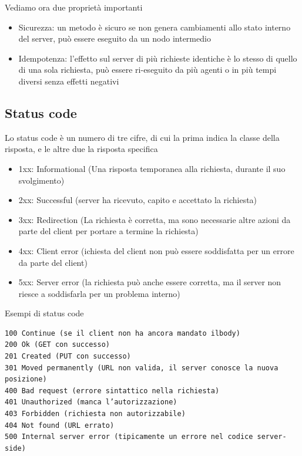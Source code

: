 \documentclass[a4paper,12pt]{article}
\begin{document}
\vspace{2em} 
Vediamo ora due proprietà importanti
\begin{itemize}
  \item Sicurezza: un metodo è sicuro se non genera cambiamenti allo stato interno del server, può essere eseguito da un nodo intermedio
  \item Idempotenza: l’effetto sul server di più richieste identiche è lo stesso di quello di una sola richiesta, può essere ri-eseguito da più agenti o in più tempi diversi senza effetti negativi
\end{itemize}
\subsection*{Status code}
Lo status code è un numero di tre cifre, di cui la prima indica la classe della risposta, e le altre due la risposta specifica
\begin{itemize}
  \item 1xx: Informational (Una risposta temporanea alla richiesta, durante il suo svolgimento)
  \item 2xx: Successful (server ha ricevuto, capito e accettato la richiesta)
  \item 3xx: Redirection (La richiesta è corretta, ma sono necessarie altre azioni da parte del client per portare a termine la richiesta)
  \item 4xx: Client error (ichiesta del client non può essere soddisfatta per un errore da parte del client)
  \item 5xx: Server error (la richiesta può anche essere corretta, ma il server non riesce a soddisfarla per un problema interno)
\end{itemize}
Esempi di status code
\begin{verbatim}
100 Continue (se il client non ha ancora mandato ilbody)
200 Ok (GET con successo)
201 Created (PUT con successo)
301 Moved permanently (URL non valida, il server conosce la nuova posizione)
400 Bad request (errore sintattico nella richiesta)
401 Unauthorized (manca l’autorizzazione)
403 Forbidden (richiesta non autorizzabile)
404 Not found (URL errato)
500 Internal server error (tipicamente un errore nel codice server-side)
\end{verbatim}
\end{document}
